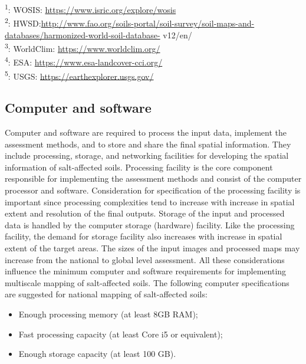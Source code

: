 \documentclass[
  10pt,
  b5paper,
]{book}
\providecommand{\tightlist}{%
  \setlength{\itemsep}{0pt}\setlength{\parskip}{0pt}}
\begin{document}
\textsuperscript{1}: WOSIS: \url{https://www.isric.org/explore/wosis}\\
\textsuperscript{2}: HWSD:\url{http://www.fao.org/soils-portal/soil-survey/soil-maps-and-databases/harmonized-world-soil-database-}
v12/en/\\
\textsuperscript{3}: WorldClim: \url{https://www.worldclim.org/}\\
\textsuperscript{4}: ESA: \url{https://www.esa-landcover-cci.org/}\\
\textsuperscript{5}: USGS: \url{https://earthexplorer.usgs.gov/}

\hypertarget{computer-and-software}{%
\subsection{Computer and software}\label{computer-and-software}}

Computer and software are required to process the input data, implement the assessment methods, and to store and share the final spatial information. They include processing, storage, and networking facilities for developing the spatial information of salt-affected soils. Processing facility is the core component responsible for implementing the assessment methods and consist of the computer processor and software. Consideration for specification of the processing facility is important since processing complexities tend to increase with increase in spatial extent and resolution of the final outputs. Storage of the input and processed data is handled by the computer storage (hardware) facility. Like the processing facility, the demand for storage facility also increases with increase in spatial extent of the target areas. The sizes of the input images and processed maps may increase from the national to global level assessment. All these considerations influence the minimum computer and software requirements for implementing multiscale mapping of salt-affected soils. The following computer specifications are suggested for national mapping of salt-affected soils:

\begin{itemize}
\tightlist
\item
  Enough processing memory (at least 8GB RAM);\\
\item
  Fast processing capacity (at least Core i5 or equivalent);\\
\item
  Enough storage capacity (at least 100 GB).
\end{itemize}
\end{document}
